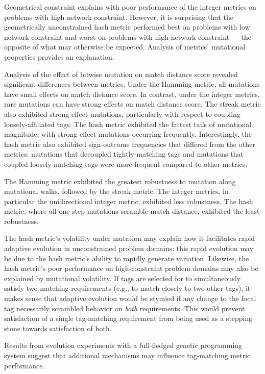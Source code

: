 Geometrical constraint explains with poor performance of the integer metrics on problems with high network constraint.
However, it is surprising that the geometrically unconstrained hash metric performed best on problems with low network constraint and worst on problems with high network constraint  --- the opposite of what may otherwise be expected.
Analysis of metrics' mutational properties provides an explanation.

Analysis of the effect of bitwise mutation on match distance score revealed significant differences between metrics.
Under the Hamming metric, all mutations have small effects on match distance score.
In contrast, under the integer metrics, rare mutations can have strong effects on match distance score.
The streak metric also exhibited strong-effect mutations, particularly with respect to coupling loosely-affiliated tags.
The hash metric exhibited the fattest tails of mutational magnitude, with strong-effect mutations occurring frequently.
Interestingly, the hash metric also exhibited sign-outcome frequencies that differed from the other metrics: mutations that decoupled tightly-matching tags and mutations that coupled loosely-matching tags were more frequent compared to other metrics.

The Hamming metric exhibited the greatest robustness to mutation along mutational walks, followed by the streak metric.
The integer metrics, in particular the unidirectional integer metric, exhibited less robustness.
The hash metric, where all one-step mutations scramble match distance, exhibited the least robustness.

The hash metric's volatility under mutation may explain how it facilitates rapid adaptive evolution in unconstrained problem domains: this rapid evolution may be due to the hash metric's ability to rapidly generate variation.
Likewise, the hash metric's poor performance on high-constraint problem domains may also be explained by mutational volatility.
If tags are selected for to simultaneously satisfy two matching requirements (e.g., to match closely to two other tags), it makes sense that adaptive evolution would be stymied if any change to the focal tag necessarily scrambled behavior on \textit{both} requirements.
This would prevent satisfaction of a single tag-matching requirement from being used as a stepping stone towards satisfaction of both.

Results from evolution experiments with a full-fledged genetic programming system suggest that additional mechanisms may influence tag-matching metric performance.

